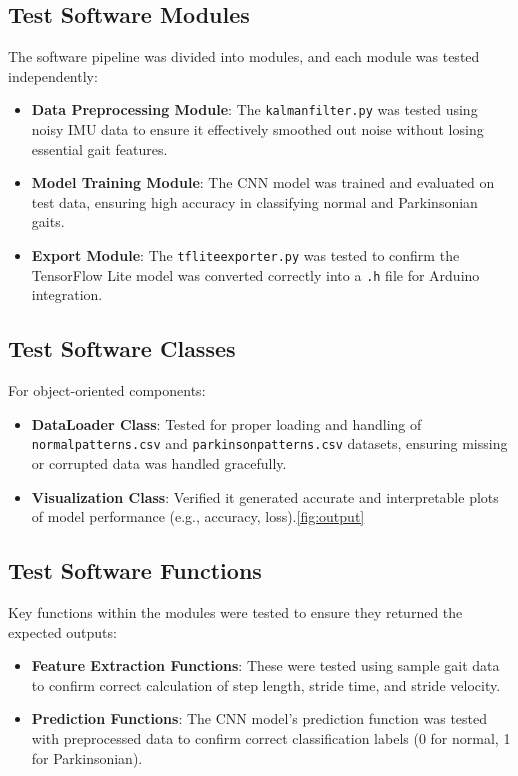 \subsection{Test Software Modules}
The software pipeline was divided into modules, and each module was tested independently:
\begin{itemize}
	\item \textbf{Data Preprocessing Module}: The \texttt{kalmanfilter.py} was tested using noisy IMU data to ensure it effectively smoothed out noise without losing essential gait features.
	\item \textbf{Model Training Module}: The CNN model was trained and evaluated on test data, ensuring high accuracy in classifying normal and Parkinsonian gaits.
	\item \textbf{Export Module}: The \texttt{tfliteexporter.py} was tested to confirm the TensorFlow Lite model was converted correctly into a \texttt{.h} file for Arduino integration.
\end{itemize}

\subsection{Test Software Classes}
For object-oriented components:
\begin{itemize}
	\item \textbf{DataLoader Class}: Tested for proper loading and handling of \texttt{normalpatterns.csv} and \texttt{parkinsonpatterns.csv} datasets, ensuring missing or corrupted data was handled gracefully.
	\item \textbf{Visualization Class}: Verified it generated accurate and interpretable plots of model performance (e.g., accuracy, loss).\ref{fig:output}
\end{itemize}

\subsection{Test Software Functions}
Key functions within the modules were tested to ensure they returned the expected outputs:
\begin{itemize}
	\item \textbf{Feature Extraction Functions}: These were tested using sample gait data to confirm correct calculation of step length, stride time, and stride velocity.
	\item \textbf{Prediction Functions}: The CNN model’s prediction function was tested with preprocessed data to confirm correct classification labels (0 for normal, 1 for Parkinsonian).
\end{itemize}

